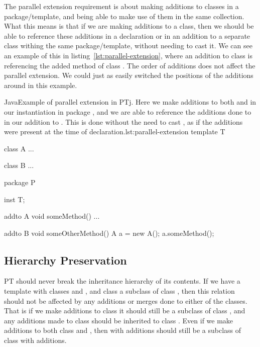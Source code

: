The parallel extension requirement is about making additions to classes in a package/template, and being able to make use of them in the same collection.
What this means is that if we are making additions to a class, then we should be able to reference these additions in a declaration or in an addition to a separate class withing the same package/template, without needing to cast it.
We can see an example of this in listing~\vref{lst:parallel-extension}, where an addition to class  is referencing the added method of class .
The order of additions does not affect the parallel extension.
We could just as easily switched the positions of the additions around in this example.

\begin{code}{Java}{Example of parallel extension in PTj. Here we make additions to both  and  in our instantiation in package , and we are able to reference the additions done to  in our addition to . This is done without the need to cast , as if the additions were present at the time of declaration.}{lst:parallel-extension}
    template T {
        class A {
            ...
        }

        class B {
            ...
        }
    }

    package P {
        inst T;

        addto A {
            void someMethod() {
                ...
            }
        }

        addto B {
            void someOtherMethod() {
                A a = new A();
                a.someMethod();
            }
        }
    }
\end{code}

\subsection{Hierarchy Preservation}\label{subsec:hierachy-preservation}
%
PT should never break the inheritance hierarchy of its contents.
If we have a template with classes  and , and class  a subclass of class , then this relation should not be affected by any additions or merges done to either of the classes.
That is if we make additions to class  it should still be a subclass of class , and any additions made to class  should be inherited to class .
Even if we make additions to both class  and , then  with additions should still be a subclass of class  with additions.

